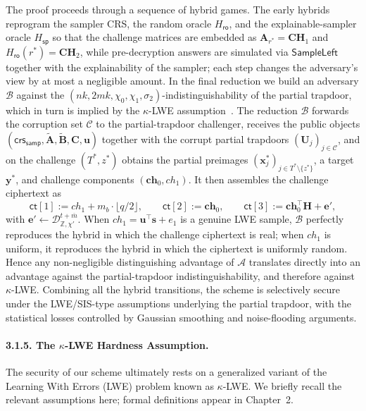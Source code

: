 The proof proceeds through a sequence of hybrid games. The early hybrids
reprogram the sampler CRS, the random oracle $H_{\mathsf{ro}}$, and the
explainable-sampler oracle $H_{\mathsf{sp}}$ so that the challenge matrices are
embedded as $\mathbf{A}_{r^\ast} = \mathbf{C}\mathbf{H}_1$ and
$H_{\mathsf{ro}}(r^\ast) = \mathbf{C}\mathbf{H}_2$, while pre-decryption answers
are simulated via $\mathsf{SampleLeft}$ together with the explainability of the
sampler; each step changes the adversary's view by at most a negligible amount.
In the final reduction we build an adversary $\mathcal{B}$ against the
$(nk, 2mk, \chi_0, \chi_1, \sigma_2)$-indistinguishability of the partial
trapdoor, which in turn is implied by the $\kappa$-LWE assumption~\cite{AC:ALLW25}.
The reduction $\mathcal{B}$ forwards the corruption set $\mathcal{C}$ to the
partial-trapdoor challenger, receives the public objects
$(\mathsf{crs}_{\mathsf{samp}}, \tilde{\mathbf{A}}, \tilde{\mathbf{B}},
\mathbf{C}, \mathbf{u})$ together with the corrupt partial trapdoors
$(\mathbf{U}_j)_{j\in\mathcal{C}}$, and on the challenge $(T^\ast, z^\ast)$ obtains
the partial preimages $(\mathbf{x}^\ast_j)_{j\in T^\ast\setminus\{z^\ast\}}$, a
target $\mathbf{y}^\ast$, and challenge components $(\mathbf{ch}_0, ch_1)$. It then
assembles the challenge ciphertext as
\[
  \mathsf{ct}[1] := ch_1 + m_b\cdot\lfloor q/2\rfloor, \qquad
  \mathsf{ct}[2] := \mathbf{ch}_0, \qquad
  \mathsf{ct}[3] := \mathbf{ch}_0^\top\mathbf{H} + \mathbf{e}',
\]
with $\mathbf{e}'\leftarrow\mathcal{D}_{\mathbb{Z},\chi'}^{t+\overline{m}}$. When
$ch_1 = \mathbf{u}^\top\mathbf{s} + e_1$ is a genuine LWE sample, $\mathcal{B}$
perfectly reproduces the hybrid in which the challenge ciphertext is real;
when $ch_1$ is uniform, it reproduces the hybrid in which the ciphertext is
uniformly random. Hence any non-negligible distinguishing advantage of
$\mathcal{A}$ translates directly into an advantage against the partial-trapdoor
indistinguishability, and therefore against $\kappa$-LWE. Combining all the
hybrid transitions, the scheme is selectively secure under the LWE/SIS-type
assumptions underlying the partial trapdoor, with the statistical losses
controlled by Gaussian smoothing and noise-flooding arguments.

\paragraph{3.1.5. The $\kappa$-LWE Hardness Assumption.}
The security of our scheme ultimately rests on a generalized variant of the
Learning With Errors (LWE) problem known as $\kappa$-LWE. We briefly recall the
relevant assumptions here; formal definitions appear in Chapter~2.

